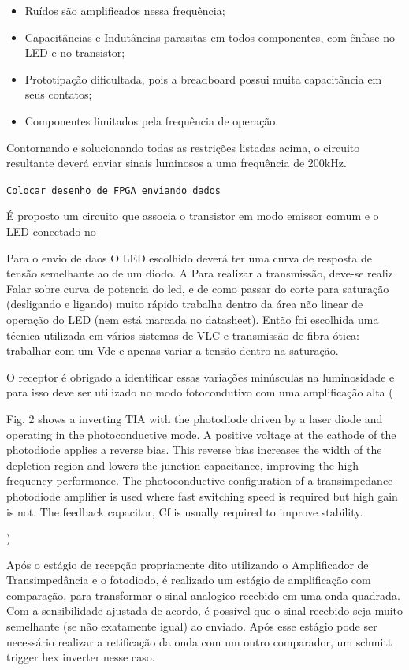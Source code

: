 	\begin{itemize}  
		\item Ruídos são amplificados nessa frequência;
		\item Capacitâncias e Indutâncias parasitas em todos componentes, com ênfase no LED e no transistor;
		\item Prototipação dificultada, pois a breadboard possui muita capacitância em seus contatos;
		\item Componentes limitados pela frequência de operação.
	\end{itemize}
	
	Contornando e solucionando todas as restrições listadas acima, o circuito resultante deverá enviar sinais luminosos a uma frequência de 200kHz.
	 
	\texttt{Colocar desenho de FPGA enviando dados}
	
	É proposto um circuito que associa o transistor em modo emissor comum e o LED conectado no 	
	
	Para o envio de daos
	O LED escolhido deverá ter uma curva de resposta de tensão semelhante ao de um diodo. A 
	Para realizar a transmissão, deve-se realiz
	Falar sobre curva de potencia do led, e de como passar do corte para saturação (desligando e ligando) muito rápido trabalha dentro da área não linear de operação do LED (nem está marcada no datasheet). Então foi escolhida uma técnica utilizada em vários sistemas de VLC e transmissão de fibra ótica: trabalhar com um Vdc e apenas variar a tensão dentro na saturação.
	
	O receptor é obrigado a identificar essas variações minúsculas na luminosidade e para isso deve ser utilizado no modo fotocondutivo com uma amplificação alta (
	
	Fig. 2 shows a inverting TIA with the photodiode driven by a laser diode and operating in the photoconductive mode. A positive voltage at the cathode of the photodiode applies a reverse bias. This reverse bias increases the width of the depletion region and lowers the junction capacitance, improving the high frequency performance. The photoconductive configuration of a transimpedance photodiode amplifier is used where fast switching speed is required but high gain is not. The feedback capacitor, Cf is usually required to improve stability.
	
	)
	
	Após o estágio de recepção propriamente dito utilizando o Amplificador de Transimpedância e o fotodiodo, é realizado um estágio de amplificação com comparação, para transformar o sinal analogico recebido em uma onda quadrada. Com a sensibilidade ajustada de acordo, é possível que o sinal recebido seja muito semelhante (se não exatamente igual) ao enviado. Após esse estágio pode ser necessário realizar a retificação da onda com um outro comparador, um schmitt trigger hex inverter nesse caso.
	
